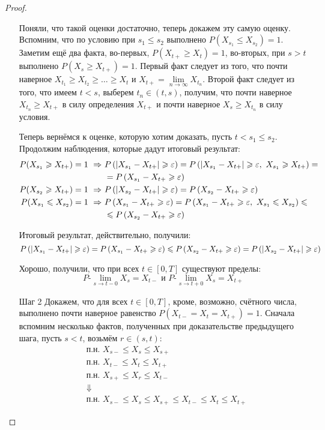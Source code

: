 \begin{proof}
\begin{itemize}
        Поняли, что такой оценки достаточно, теперь докажем эту самую оценку. Вспомним, что по условию при $s_1 \le s_2$ выполнено $P(X_{s_1} \le X_{s_2}) = 1$. Заметим ещё два факта, во-первых, $P(X_{t+} \ge X_t) = 1$, во-вторых, при $s > t$ выполнено $P(X_s \ge X_{t+}) = 1$. Первый факт следует из того, что почти наверное $X_{t_1} \ge X_{t_2} \ge \dots \ge X_t$ и $X_{t+} = \lim\limits_{n \to \infty} X_{t_n}$. Второй факт следует из того, что имеем $t < s$, выберем $t_n \in (t, s)$, получим, что почти наверное $X_{t_n} \ge X_{t+}$ в силу определения $X_{t+}$ и почти наверное $X_s \ge X_{t_n}$ в силу условия.
        
        Теперь вернёмся к оценке, которую хотим доказать, пусть $t < s_1 \le s_2$. Продолжим наблюдения, которые дадут итоговый результат:
        \begin{align*}
            P(X_{s_1} \geqslant X_{t+}) = 1 \ \Rightarrow \ & P\left(|X_{s_1} - X_{t+}| \geqslant \varepsilon\right) = P\left(|X_{s_1} - X_{t+}| \geqslant \varepsilon,\ X_{s_1} \geqslant X_{t+}\right) =
            \\
            & = P\left(X_{s_1} - X_{t+} \geqslant \varepsilon\right)
            \\
            P(X_{s_2} \geqslant X_{t+}) = 1 \ \Rightarrow \ & P\left(|X_{s_2} - X_{t+}| \geqslant \varepsilon\right) = P\left(X_{s_2} - X_{t+} \geqslant \varepsilon\right)
            \\
            P(X_{s_1} \leqslant X_{s_2}) = 1 \ \Rightarrow \ & P\left(X_{s_1} - X_{t+} \geqslant \varepsilon\right) = P\left(X_{s_1} - X_{t+} \geqslant \varepsilon,\ X_{s_1} \leqslant X_{s_2}\right) \leqslant
            \\
            & \leqslant P\left(X_{s_2} - X_{t+} \geqslant \varepsilon\right)
        \end{align*}

        Итоговый результат, действительно, получили:
        \[
            P\left(|X_{s_1} - X_{t+}| \geqslant \varepsilon\right) = P\left(X_{s_1} - X_{t+} \geqslant \varepsilon\right) \leqslant P\left(X_{s_2} - X_{t+} \geqslant \varepsilon\right) = P\left(|X_{s_2} - X_{t+}| \geqslant \varepsilon\right)
        \]

        Хорошо, получили, что при всех $t \in [0, T]$ существуют пределы:
        \[
            P\text{-}\lim\limits_{s \to t-0} X_s = X_{t-} \text{ и } P\text{-}\lim\limits_{s \to t+0} X_s = X_{t+}
        \]

        \item[Шаг 2] Докажем, что для всех $t \in [0, T]$, кроме, возможно, счётного числа, выполнено почти наверное равенство $P(X_{t-} = X_t = X_{t+}) = 1$. Сначала вспомним несколько фактов, полученных при доказательстве предыдущего шага, пусть $s < t$, возьмём $r \in (s, t)$:
        \begin{align*}
            & \text{п.н. } X_{s-} \le X_s \le X_{s+}
            \\
            & \text{п.н. } X_{t-} \le X_t \le X_{t+}
            \\
            & \text{п.н. } X_{s+} \le X_r \le X_{t-}
            \\
            & \Downarrow
            \\
            & \text{п.н. } X_{s-} \le X_s \le X_{s+} \le X_{t-} \le X_t \le X_{t+}
        \end{align*}


\end{itemize}
\end{proof}

